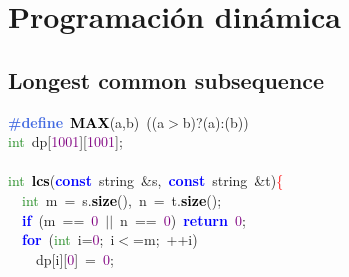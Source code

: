 \documentclass[10pt,a4paper,twoside]{article}
\begin{document}
{{{{{{{{} \normalfont\normalsize

\section{Programación dinámica}
\subsection{Longest common subsequence}
%
{\ttfamily \raggedright {
\noindent
\mbox{}\textbf{\textcolor{RoyalBlue}{\#define}}\ \textbf{\textcolor{Black}{MAX}}\textcolor{BrickRed}{(}a\textcolor{BrickRed}{,}b\textcolor{BrickRed}{)}\ \textcolor{BrickRed}{((}a\textcolor{BrickRed}{$>$}b\textcolor{BrickRed}{)?(}a\textcolor{BrickRed}{):(}b\textcolor{BrickRed}{))} \\
\mbox{}\textcolor{ForestGreen}{int}\ dp\textcolor{BrickRed}{[}\textcolor{Purple}{1001}\textcolor{BrickRed}{][}\textcolor{Purple}{1001}\textcolor{BrickRed}{];} \\
\mbox{} \\
\mbox{}\textcolor{ForestGreen}{int}\ \textbf{\textcolor{Black}{lcs}}\textcolor{BrickRed}{(}\textbf{\textcolor{Blue}{const}}\ string\ \textcolor{BrickRed}{\&}s\textcolor{BrickRed}{,}\ \textbf{\textcolor{Blue}{const}}\ string\ \textcolor{BrickRed}{\&}t\textcolor{BrickRed}{)}\textcolor{Red}{\{} \\
\mbox{}\ \ \textcolor{ForestGreen}{int}\ m\ \textcolor{BrickRed}{=}\ s\textcolor{BrickRed}{.}\textbf{\textcolor{Black}{size}}\textcolor{BrickRed}{(),}\ n\ \textcolor{BrickRed}{=}\ t\textcolor{BrickRed}{.}\textbf{\textcolor{Black}{size}}\textcolor{BrickRed}{();} \\
\mbox{}\ \ \textbf{\textcolor{Blue}{if}}\ \textcolor{BrickRed}{(}m\ \textcolor{BrickRed}{==}\ \textcolor{Purple}{0}\ \textcolor{BrickRed}{$||$}\ n\ \textcolor{BrickRed}{==}\ \textcolor{Purple}{0}\textcolor{BrickRed}{)}\ \textbf{\textcolor{Blue}{return}}\ \textcolor{Purple}{0}\textcolor{BrickRed}{;} \\
\mbox{}\ \ \textbf{\textcolor{Blue}{for}}\ \textcolor{BrickRed}{(}\textcolor{ForestGreen}{int}\ i\textcolor{BrickRed}{=}\textcolor{Purple}{0}\textcolor{BrickRed}{;}\ i\textcolor{BrickRed}{$<$=}m\textcolor{BrickRed}{;}\ \textcolor{BrickRed}{++}i\textcolor{BrickRed}{)} \\
\mbox{}\ \ \ \ dp\textcolor{BrickRed}{[}i\textcolor{BrickRed}{][}\textcolor{Purple}{0}\textcolor{BrickRed}{]}\ \textcolor{BrickRed}{=}\ \textcolor{Purple}{0}\textcolor{BrickRed}{;} \\
}}}}}}}}}
\end{document}
